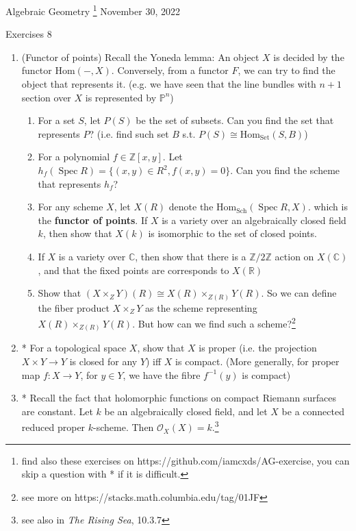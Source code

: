\documentclass[a4paper,11pt]{article}
\def\bb#1{\mathbb{#1}}
\def\mrm#1{\mathrm{#1}}
\def\Hom{\mathrm{Hom}}
\DeclareMathOperator{\Spec}{Spec}
\begin{document}
{\small Algebraic Geometry
\footnote{find also these exercises on https://github.com/iamcxds/AG-exercise, you can skip a question with * if it is difficult.}
 \hfill November 30, 2022 \\}
\begin{center}
\Huge Exercises 8
\end{center}


\vskip0.6cm


\begin{enumerate}[1.]

\item (Functor of points)
Recall the Yoneda lemma: An object $X$ is decided by the functor $\Hom(-, X)$. Conversely, from a functor $F$, we can try to find the object that represents it. (e.g. we have seen that the line bundles with $n+1$ section over $X$ is represented by $\bb{P}^n$)
\begin{enumerate}
    \item For a set $S$, let $P(S)$ be the set of subsets. Can you find the set that represents $P$? (i.e. find such set $B$ s.t. $P(S)\cong \Hom_{\mrm{Set}}(S,B)$) 
    \item For a polynomial $f\in \bb{Z}[x,y]$. Let $h_f(\Spec R)=\{(x,y)\in R^2, f(x,y)=0\}$. Can you find the scheme that represents $h_f$?
    \item For any scheme $X$, let $X(R)$ denote the $\Hom_{\mrm{Sch}}(\Spec R, X)$. which is the \textbf{functor of points}. If $X$ is a variety over an algebraically closed field $k$, then show that $X(k)$ is isomorphic to the set of closed points.
    \item If $X$ is a variety over $\bb{C}$, then show that there is a $\bb{Z}/2\bb{Z}$ action on $X(\bb{C})$, and that the fixed points are corresponds to $X(\bb{R})$
    \item Show that $(X\times_Z Y)(R)\cong X(R)\times_{Z(R)} Y(R)$. So we can define the fiber product $X\times_Z Y$ as the scheme representing $  X(R)\times_{Z(R)} Y(R) $. But how can we find such a scheme?\footnote{see more on https://stacks.math.columbia.edu/tag/01JF}
    
\end{enumerate}
\item* For a topological space $X$, show that $X$ is proper (i.e. the projection $X\times Y\to Y$ is closed for any $Y$) iff $X$ is compact. (More generally, for proper map $f:X\to Y$, for $y\in Y$, we have the fibre $f^{-1}(y)$ is compact)
\item* Recall the fact that holomorphic functions on compact Riemann surfaces are constant. Let $k$ be an algebraically closed field, and let  $X$ be a connected reduced proper $k$-scheme. Then $\mathcal{O}_X(X)=k$.\footnote{see also in \textit{The Rising Sea}, 10.3.7}
\end{enumerate}
\end{document}
